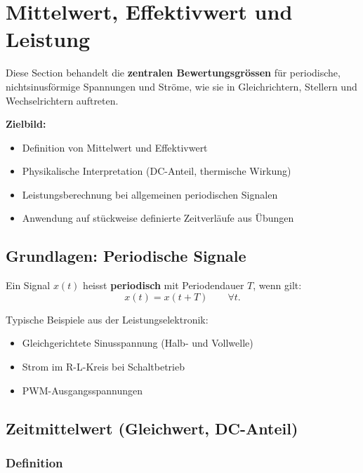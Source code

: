 \section{Mittelwert, Effektivwert und Leistung}

Diese Section behandelt die \textbf{zentralen Bewertungsgrössen} für periodische, nichtsinusförmige Spannungen und Ströme,
wie sie in Gleichrichtern, Stellern und Wechselrichtern auftreten.

\smallskip

\textbf{Zielbild:}
\begin{itemize}
    \item Definition von Mittelwert und Effektivwert
    \item Physikalische Interpretation (DC-Anteil, thermische Wirkung)
    \item Leistungsberechnung bei allgemeinen periodischen Signalen
    \item Anwendung auf stückweise definierte Zeitverläufe aus Übungen
\end{itemize}

\subsection{Grundlagen: Periodische Signale}

Ein Signal $x(t)$ heisst \textbf{periodisch} mit Periodendauer $T$, wenn gilt:
\[
x(t) = x(t+T) \qquad \forall t.
\]

Typische Beispiele aus der Leistungselektronik:
\begin{itemize}
    \item Gleichgerichtete Sinusspannung (Halb- und Vollwelle)
    \item Strom im R-L-Kreis bei Schaltbetrieb
    \item PWM-Ausgangsspannungen
\end{itemize}


\subsection{Zeitmittelwert (Gleichwert, DC-Anteil)}

\subsubsection{Definition}

